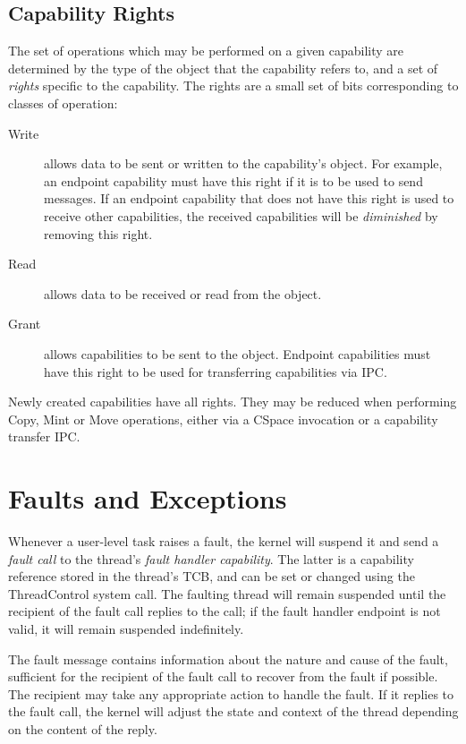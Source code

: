 \subsection{Capability Rights}\label{sec:overview.cspace.rights}

The set of operations which may be performed on a given capability are
determined by the type of the object that the capability refers to, and a set
of \emph{rights} specific to the capability. The rights are a small set of bits corresponding to classes of operation:

\begin{description}
\item[Write] allows data to be sent or written to the capability's object. For
example, an endpoint capability must have this right if it is to be used to
send messages. If an endpoint capability that does not have this right is used to receive other capabilities, the received capabilities will be \emph{diminished} by removing this right.

\item[Read] allows data to be received or read from the object.

\item[Grant] allows capabilities to be sent to the object. Endpoint capabilities must have this right to be used for transferring capabilities via IPC.
\end{description}

Newly created capabilities have all rights. They may be reduced when performing
Copy, Mint or Move operations, either via a CSpace invocation or a capability
transfer IPC. 

\section{Faults and Exceptions}\label{sec:overview.faults}

Whenever a user-level task raises a fault, the kernel will suspend
it and send a \emph{fault call} to the thread's \emph{fault handler
capability}. The latter is a capability reference stored in the thread's TCB,
and can be set or changed using the ThreadControl system call. The faulting thread will remain suspended until the recipient of the fault call replies to the call; if the fault handler endpoint is not valid, it will remain suspended indefinitely.

The fault message contains information about the nature and cause of the
fault, sufficient for the recipient of the fault call to recover from the
fault if possible. The recipient may take any appropriate action to handle the fault. If it replies to the fault call, the kernel will adjust the state and context of the thread depending on the content of the reply.

